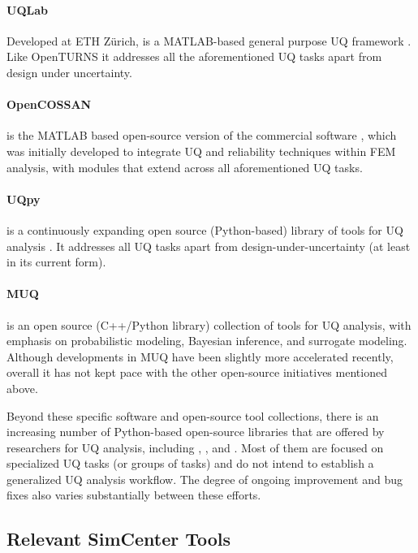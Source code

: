 \paragraph{UQLab} Developed at ETH Zürich,  is a MATLAB-based general purpose UQ framework \citep{marelli2014uqlab}. Like OpenTURNS it addresses all the aforementioned UQ tasks apart from design under uncertainty. 

\paragraph{OpenCOSSAN} 
 is the MATLAB based open-source version of the commercial software  \citep{patelli2017cossan}, which was initially developed to integrate UQ and reliability techniques within FEM analysis, with modules that extend across all aforementioned UQ tasks.

\paragraph{UQpy}  is a continuously expanding open source (Python-based) library of tools for UQ analysis \citep{olivier2020uqpy}. It addresses all UQ tasks apart from design-under-uncertainty (at least in its current form).

\paragraph{MUQ} 
 is an open source (C++/Python library) collection of tools for UQ analysis, with emphasis on probabilistic modeling, Bayesian inference, and surrogate modeling. Although developments in MUQ have been slightly more accelerated recently, overall it has not kept pace with the other open-source initiatives mentioned above.


Beyond these specific software and open-source tool collections, there is an increasing number of Python-based open-source libraries that are offered by researchers for UQ analysis, including , , and . Most of them are focused on specialized UQ tasks (or groups of tasks) and do not intend to establish a generalized UQ analysis workflow. The degree of ongoing improvement and bug fixes also varies substantially between these efforts.

\subsection{Relevant SimCenter Tools}

